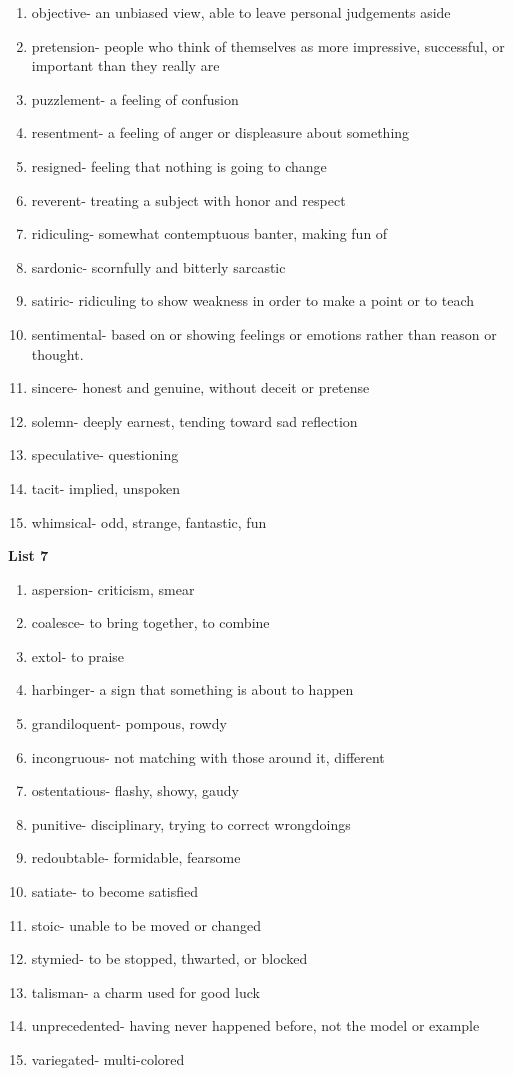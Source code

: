 \begin{enumerate}
\item objective- an unbiased view, able to leave personal judgements aside
\item pretension- people who think of themselves as more impressive, successful, or important than they really are
\item puzzlement- a feeling of confusion
\item resentment- a feeling of anger or displeasure about something
\item resigned- feeling that nothing is going to change
\item reverent- treating a subject with honor and respect
\item ridiculing- somewhat contemptuous banter, making fun of
\item sardonic- scornfully and bitterly sarcastic
\item satiric- ridiculing to show weakness in order to make a point or to teach
\item sentimental- based on or showing feelings or emotions rather than reason or thought. 
\item sincere- honest and genuine, without deceit or pretense
\item solemn- deeply earnest, tending toward sad reflection
\item speculative- questioning
\item tacit- implied, unspoken
\item whimsical- odd, strange, fantastic, fun
\end{enumerate}

\textbf{List 7}

\begin{enumerate}
\item aspersion- criticism, smear
\item coalesce- to bring together, to combine
\item extol- to praise
\item harbinger- a sign that something is about to happen
\item grandiloquent- pompous, rowdy
\item incongruous- not matching with those around it, different
\item ostentatious- flashy, showy, gaudy
\item punitive- disciplinary, trying to correct wrongdoings 
\item redoubtable- formidable, fearsome
\item satiate- to become satisfied
\item stoic- unable to be moved or changed
\item stymied- to be stopped, thwarted, or blocked
\item talisman- a charm used for good luck
\item unprecedented- having never happened before, not the model or example
\item variegated- multi-colored
\end{enumerate}

